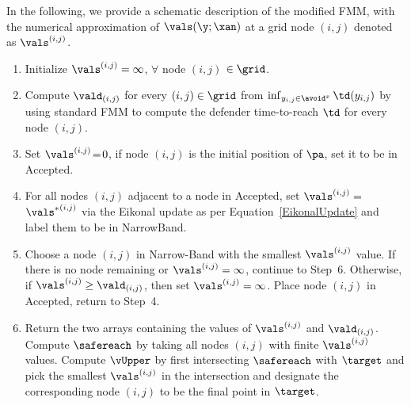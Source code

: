 In the following, we provide a schematic description of the modified FMM, with the numerical approximation of $\vals(\y;\xan)$ at a grid node $(i,j)$ denoted as $\vals^{(i,j)}$. 
\begin{enumerate}
\item
Initialize $\vals^{(i,j)}=\infty$, $\forall$ node $(i,j)$ $ \in\grid$.  
\item
Compute $\vald_{(i,j)}$ for every $(i,j) \in \grid$ from $\inf_{y_{i,j} \in \avoid^x} \td(y_{i,j})$ by using standard FMM to compute the defender time-to-reach $\td$ for every node $({i,j})$.  
\item 
\label{step:initFMMUpper}
Set $\vals^{(i,j)}\! =\! 0$, if node $(i,j)$ is the initial position of $\pa$, set it to be in $\text{Accepted}$. 
\item 
\label{step:startFMMUpper}
For all nodes $(i,j)$ adjacent to a node in Accepted, set $\vals^{(i,j)} =$ ${\vals^*}^{(i,j)}$ via the Eikonal update as per Equation~\eqref{EikonalUpdate} and label them to be in NarrowBand. 
\item
\label{step:updateFMMUpper}
Choose a node $(i,j)$ in Narrow-Band with the smallest $\vals^{(i,j)}$ value. 
If there is no node remaining or $\vals^{(i,j)} = \infty$, continue to Step~6.
Otherwise, if $\vals^{(i,j)} \ge \vald_{(i,j)}$, then set $\vals^{(i,j)}=\infty$. Place node $(i,j)$ in Accepted, return to Step~4. 

\item
\label{step:endFMMUpper}
Return the two arrays containing the values of $\vals^{(i,j)}$ and $\vald_{(i,j)}$.
Compute $\safereach$ by taking all nodes $(i,j)$ with finite $\vals^{(i,j)}$ values.
Compute $\vUpper$ by first intersecting $\safereach$ with $\target$ and pick the smallest 
$\vals^{(i,j)}$ in the intersection and designate the corresponding node $(i,j)$ to be the final point in 
$\target$.





\end{enumerate}
